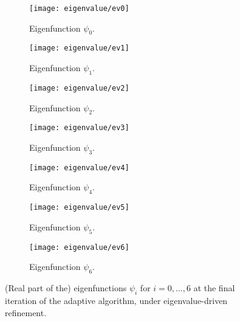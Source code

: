 \documentclass[12pt]{amsart}
\begin{document}
\begin{figure}[htbp]
    \begin{subfigure}[t]{0.49\textwidth}
        \centering
        \texttt{[image: eigenvalue/ev0]}
        \caption{Eigenfunction \(\psi_0\).}
        \label{fig:eigenfunction_0}
    \end{subfigure}
    \begin{subfigure}[t]{0.49\textwidth}
        \centering
        \texttt{[image: eigenvalue/ev1]}
        \caption{Eigenfunction \(\psi_1\).}
        \label{fig:eigenfunction_1}
    \end{subfigure}
    \vspace{1cm}
    \begin{subfigure}[t]{0.49\textwidth}
        \centering
        \texttt{[image: eigenvalue/ev2]}
        \caption{Eigenfunction \(\psi_2\).}
        \label{fig:eigenfunction_2}
    \end{subfigure}
    \begin{subfigure}[t]{0.49\textwidth}
        \centering
        \texttt{[image: eigenvalue/ev3]}
        \caption{Eigenfunction \(\psi_3\).}
        \label{fig:eigenfunction_3}
    \end{subfigure}
    \vspace{1cm}
    \begin{subfigure}[t]{0.49\textwidth}
        \centering
        \texttt{[image: eigenvalue/ev4]}
        \caption{Eigenfunction \(\psi_4\).}
        \label{fig:eigenfunction_4}
    \end{subfigure}
    \begin{subfigure}[t]{0.49\textwidth}
        \centering
        \texttt{[image: eigenvalue/ev5]}
        \caption{Eigenfunction \(\psi_5\).}
        \label{fig:eigenfunction_5}
    \end{subfigure}
    \vspace{1cm}
    \begin{subfigure}[t]{0.49\textwidth}
        \centering
        \texttt{[image: eigenvalue/ev6]}
        \caption{Eigenfunction \(\psi_6\).}
        \label{fig:eigenfunction_6}
    \end{subfigure}
    \caption{(Real part of the) eigenfunctions \(\psi_i\) for \(i = 0, \ldots, 6\) at the final iteration of the adaptive algorithm, under eigenvalue-driven refinement.}
\end{figure}
\end{document}

